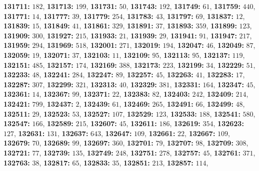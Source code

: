 \textsf{\bfseries 131711:} $182$, \textsf{\bfseries 131713:} $199$, \textsf{\bfseries 131731:} $50$, \textsf{\bfseries 131743:} $192$, \textsf{\bfseries 131749:} $61$, \textsf{\bfseries 131759:} $440$, \textsf{\bfseries 131771:} $14$, \textsf{\bfseries 131777:} $39$, \textsf{\bfseries 131779:} $254$, \textsf{\bfseries 131783:} $43$, \textsf{\bfseries 131797:} $69$, \textsf{\bfseries 131837:} $12$, \textsf{\bfseries 131839:} $15$, \textsf{\bfseries 131849:} $41$, \textsf{\bfseries 131861:} $329$, \textsf{\bfseries 131891:} $37$, \textsf{\bfseries 131893:} $359$, \textsf{\bfseries 131899:} $123$, \textsf{\bfseries 131909:} $300$, \textsf{\bfseries 131927:} $215$, \textsf{\bfseries 131933:} $21$, \textsf{\bfseries 131939:} $29$, \textsf{\bfseries 131941:} $91$, \textsf{\bfseries 131947:} $217$, \textsf{\bfseries 131959:} $294$, \textsf{\bfseries 131969:} $518$, \textsf{\bfseries 132001:} $271$, \textsf{\bfseries 132019:} $194$, \textsf{\bfseries 132047:} $46$, \textsf{\bfseries 132049:} $87$, \textsf{\bfseries 132059:} $19$, \textsf{\bfseries 132071:} $37$, \textsf{\bfseries 132103:} $11$, \textsf{\bfseries 132109:} $95$, \textsf{\bfseries 132113:} $95$, \textsf{\bfseries 132137:} $119$, \textsf{\bfseries 132151:} $485$, \textsf{\bfseries 132157:} $174$, \textsf{\bfseries 132169:} $388$, \textsf{\bfseries 132173:} $223$, \textsf{\bfseries 132199:} $34$, \textsf{\bfseries 132229:} $51$, \textsf{\bfseries 132233:} $48$, \textsf{\bfseries 132241:} $284$, \textsf{\bfseries 132247:} $89$, \textsf{\bfseries 132257:} $45$, \textsf{\bfseries 132263:} $41$, \textsf{\bfseries 132283:} $17$, \textsf{\bfseries 132287:} $307$, \textsf{\bfseries 132299:} $321$, \textsf{\bfseries 132313:} $40$, \textsf{\bfseries 132329:} $381$, \textsf{\bfseries 132331:} $164$, \textsf{\bfseries 132347:} $45$, \textsf{\bfseries 132361:} $14$, \textsf{\bfseries 132367:} $99$, \textsf{\bfseries 132371:} $22$, \textsf{\bfseries 132383:} $82$, \textsf{\bfseries 132403:} $242$, \textsf{\bfseries 132409:} $214$, \textsf{\bfseries 132421:} $799$, \textsf{\bfseries 132437:} $2$, \textsf{\bfseries 132439:} $61$, \textsf{\bfseries 132469:} $265$, \textsf{\bfseries 132491:} $66$, \textsf{\bfseries 132499:} $48$, \textsf{\bfseries 132511:} $29$, \textsf{\bfseries 132523:} $53$, \textsf{\bfseries 132527:} $107$, \textsf{\bfseries 132529:} $123$, \textsf{\bfseries 132533:} $188$, \textsf{\bfseries 132541:} $580$, \textsf{\bfseries 132547:} $166$, \textsf{\bfseries 132589:} $215$, \textsf{\bfseries 132607:} $45$, \textsf{\bfseries 132611:} $186$, \textsf{\bfseries 132619:} $354$, \textsf{\bfseries 132623:} $127$, \textsf{\bfseries 132631:} $131$, \textsf{\bfseries 132637:} $643$, \textsf{\bfseries 132647:} $109$, \textsf{\bfseries 132661:} $22$, \textsf{\bfseries 132667:} $109$, \textsf{\bfseries 132679:} $70$, \textsf{\bfseries 132689:} $99$, \textsf{\bfseries 132697:} $360$, \textsf{\bfseries 132701:} $79$, \textsf{\bfseries 132707:} $98$, \textsf{\bfseries 132709:} $308$, \textsf{\bfseries 132721:} $77$, \textsf{\bfseries 132739:} $135$, \textsf{\bfseries 132749:} $248$, \textsf{\bfseries 132751:} $278$, \textsf{\bfseries 132757:} $45$, \textsf{\bfseries 132761:} $371$, \textsf{\bfseries 132763:} $38$, \textsf{\bfseries 132817:} $65$, \textsf{\bfseries 132833:} $35$, \textsf{\bfseries 132851:} $213$, \textsf{\bfseries 132857:} $114$, 
